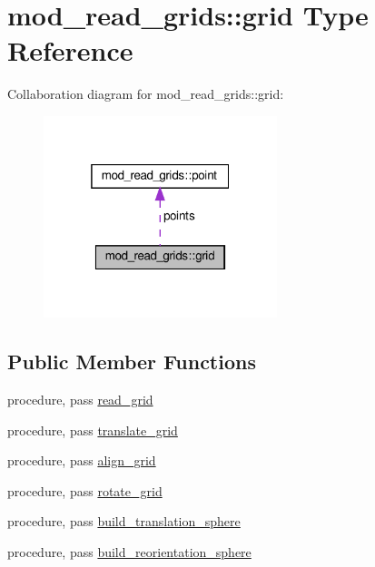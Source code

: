 \hypertarget{structmod__read__grids_1_1grid}{}\section{mod\+\_\+read\+\_\+grids\+:\+:grid Type Reference}
\label{structmod__read__grids_1_1grid}


Collaboration diagram for mod\+\_\+read\+\_\+grids\+:\+:grid\+:
\nopagebreak
\begin{figure}[H]
\begin{center}
\leavevmode
\includegraphics[width=193pt]{structmod__read__grids_1_1grid__coll__graph}
\end{center}
\end{figure}
\subsection*{Public Member Functions}
\begin{DoxyCompactItemize}
\item 
procedure, pass \hyperlink{structmod__read__grids_1_1grid_ace787ea57534b971bf911dd748b98e05}{read\+\_\+grid}
\item 
procedure, pass \hyperlink{structmod__read__grids_1_1grid_aacbc105ca7342a235fe376e2ec1236f4}{translate\+\_\+grid}
\item 
procedure, pass \hyperlink{structmod__read__grids_1_1grid_afe8bf79de342fe127c59a0a009b68c70}{align\+\_\+grid}
\item 
procedure, pass \hyperlink{structmod__read__grids_1_1grid_a68aa42283c88706cdaf693d9215b482c}{rotate\+\_\+grid}
\item 
procedure, pass \hyperlink{structmod__read__grids_1_1grid_aac42988e12ce7125a98fc21129c8398e}{build\+\_\+translation\+\_\+sphere}
\item 
procedure, pass \hyperlink{structmod__read__grids_1_1grid_a69ca38e3cf27b26c27bdbdcb26bb1048}{build\+\_\+reorientation\+\_\+sphere}
\end{DoxyCompactItemize}
